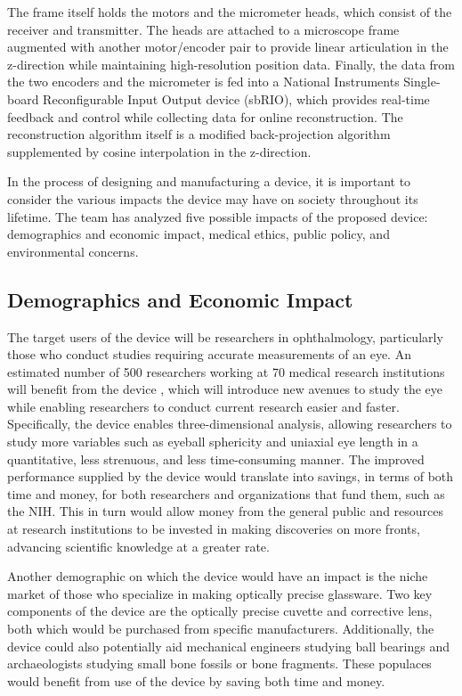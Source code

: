 \documentclass{article}
\begin{document}
The frame itself holds the motors and the micrometer heads, which
consist of the receiver and transmitter. The heads are attached to a
microscope frame augmented with another motor/encoder pair to provide
linear articulation in the z-direction while maintaining
high-resolution position data. Finally, the data from the two encoders
and the micrometer is fed into a National Instruments Single-board
Reconfigurable Input Output device (sbRIO), which provides real-time
feedback and control while collecting data for online
reconstruction. The reconstruction algorithm itself is a modified
back-projection algorithm supplemented by cosine interpolation in the
z-direction.
 
In the process of designing and manufacturing a device, it is
important to consider the various impacts the device may have on
society throughout its lifetime. The team has analyzed five possible
impacts of the proposed device: demographics and economic impact,
medical ethics, public policy, and environmental concerns.
 
 
\subsection{Demographics and Economic Impact}
\label{sec:Demographics}
 
The target users of the device will be researchers in ophthalmology,
particularly those who conduct studies requiring accurate measurements
of an eye. An estimated number of 500 researchers working at 70
medical research institutions will benefit from the device
\cite{Nickerson}, which will introduce new avenues to study the eye
while enabling researchers to conduct current research easier and
faster. Specifically, the device enables three-dimensional analysis,
allowing researchers to study more variables such as eyeball
sphericity and uniaxial eye length in a quantitative, less strenuous,
and less time-consuming manner. The improved performance supplied by
the device would translate into savings, in terms of both time and
money, for both researchers and organizations that fund them, such as
the NIH. This in turn would allow money from the general public
and resources at research institutions to be invested in making
discoveries on more fronts, advancing scientific knowledge at a
greater rate.
 
Another demographic on which the device would have an impact is the
niche market of those who specialize in making optically precise
glassware. Two key components of the device are the optically precise
cuvette and corrective lens, both which would be purchased from
specific manufacturers. Additionally, the device could also
potentially aid mechanical engineers studying ball bearings and
archaeologists studying small bone fossils or bone fragments. These
populaces would benefit from use of the device by saving both time and
money.
\end{document}
